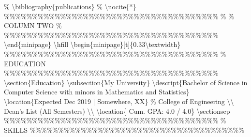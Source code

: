 \documentclass{article}%
\begin{document}
\% \textbackslash{}bibliography\{publications\}\newline%
\% \textbackslash{}nocite\{*\}\newline%
\newline%
\%\%\%\%\%\%\%\%\%\%\%\%\%\%\%\%\%\%\%\%\%\%\%\%\%\%\%\%\%\%\%\%\%\%\%\%\%\%\newline%
\%\newline%
\%     COLUMN TWO\newline%
\%\newline%
\%\%\%\%\%\%\%\%\%\%\%\%\%\%\%\%\%\%\%\%\%\%\%\%\%\%\%\%\%\%\%\%\%\%\%\%\%\%\newline%
\newline%
\textbackslash{}end\{minipage\}\newline%
\textbackslash{}hfill\newline%
\textbackslash{}begin\{minipage\}{[}t{]}\{0.33\textbackslash{}textwidth\}\newline%
\newline%
\%\%\%\%\%\%\%\%\%\%\%\%\%\%\%\%\%\%\%\%\%\%\%\%\%\%\%\%\%\%\%\%\%\%\%\%\%\%\newline%
\%     EDUCATION\newline%
\%\%\%\%\%\%\%\%\%\%\%\%\%\%\%\%\%\%\%\%\%\%\%\%\%\%\%\%\%\%\%\%\%\%\%\%\%\%\newline%
\newline%
\textbackslash{}section\{Education\}\newline%
\newline%
\textbackslash{}subsection\{My University\}\newline%
\textbackslash{}descript\{Bachelor of Science in Computer Science with minors in Mathematics and Statistics\}\newline%
\textbackslash{}location\{Expected Dec 2019 | Somewhere, XX\}\newline%
\% College of Engineering \textbackslash{}\textbackslash{}\newline%
Dean's List (All Semesters) \textbackslash{}\textbackslash{}\newline%
\textbackslash{}location\{ Cum. GPA: 4.0 / 4.0\}\newline%
\textbackslash{}sectionsep\newline%
\newline%
\%\%\%\%\%\%\%\%\%\%\%\%\%\%\%\%\%\%\%\%\%\%\%\%\%\%\%\%\%\%\%\%\%\%\%\%\%\%\newline%
\%     SKILLS\newline%
\%\%\%\%\%\%\%\%\%\%\%\%\%\%\%\%\%\%\%\%\%\%\%\%\%\%\%\%\%\%\%\%\%\%\%\%\%\%\newline%
\end{document}
